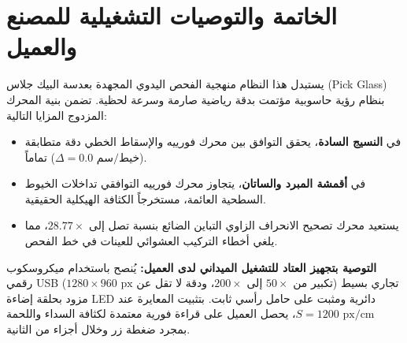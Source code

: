 \documentclass[11pt,a4paper]{article}
\begin{document}
\section{الخاتمة والتوصيات التشغيلية للمصنع والعميل}

يستبدل هذا النظام منهجية الفحص اليدوي المجهدة بعدسة البيك جلاس (Pick Glass) بنظام رؤية حاسوبية مؤتمت بدقة رياضية صارمة وسرعة لحظية. تضمن بنية المحرك المزدوج المزايا التالية:
\begin{itemize}
    \item في \textbf{النسيج السادة}، يحقق التوافق بين محرك فورييه والإسقاط الخطي دقة متطابقة تماماً ($\Delta = 0.0\text{ خيط/سم}$).
    \item في \textbf{أقمشة المبرد والساتان}، يتجاوز محرك فورييه التوافقي تداخلات الخيوط السطحية العائمة، مستخرجاً الكثافة الهيكلية الحقيقية.
    \item يستعيد محرك تصحيح الانحراف الزاوي التباين الضائع بنسبة تصل إلى $28.77\times$، مما يلغي أخطاء التركيب العشوائي للعينات في خط الفحص.
\end{itemize}

\textbf{التوصية بتجهيز العتاد للتشغيل الميداني لدى العميل:}
يُنصح باستخدام ميكروسكوب رقمي USB تجاري بسيط (تكبير من $50\times$ إلى $200\times$، ودقة لا تقل عن $1280\times 960\text{ px}$) مزود بحلقة إضاءة LED دائرية ومثبت على حامل رأسي ثابت. بتثبيت المعايرة عند $S = 1200\text{ px/cm}$، يحصل العميل على قراءة فورية معتمدة لكثافة السداء واللحمة بمجرد ضغطة زر وخلال أجزاء من الثانية.
\end{document}
